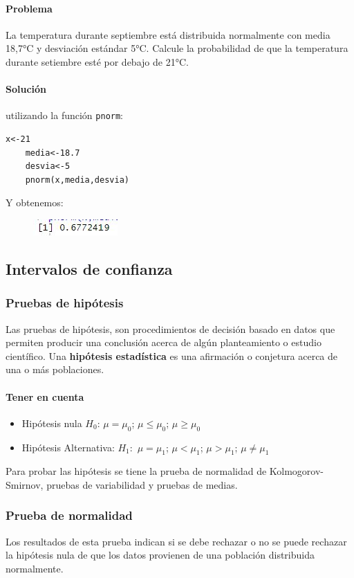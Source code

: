 \documentclass[12pt,hidelinks]{article}
\begin{document}
\paragraph{Problema} La temperatura durante septiembre está distribuida normalmente con media 18,7°C y desviación estándar 5°C. Calcule la probabilidad de que la temperatura durante setiembre esté por debajo de 21°C.
\paragraph{Solución} utilizando la función \texttt{pnorm}:
\begin{lstlisting}[frame=single]
	x<-21
	media<-18.7
	desvia<-5
	pnorm(x,media,desvia)
\end{lstlisting}
Y obtenemos:
\begin{figure}[h!]
	\centering
	\includegraphics[scale=1]{images/3/normal.JPG}
\end{figure}
\subsection{Intervalos de confianza}
\subsubsection{Pruebas de hipótesis}
Las pruebas de hipótesis, son procedimientos de decisión basado en datos que permiten producir una conclusión acerca de algún planteamiento o estudio científico. Una \textbf{hipótesis estadística} es una afirmación o conjetura acerca de una o más poblaciones.
\paragraph{Tener en cuenta}
\begin{itemize}
	\item Hipótesis nula  $H_0$: $\mu=\mu_0$; $\mu\leq\mu_0$; $\mu\geq\mu_0$
	\item Hipótesis Alternativa: $H_1:$ $\mu=\mu_1$; $\mu<\mu_1$; $\mu>\mu_1$; $\mu\neq\mu_1$
\end{itemize}
Para probar las hipótesis se tiene la prueba de normalidad de Kolmogorov-Smirnov, pruebas de variabilidad y pruebas de medias.
\subsubsection{Prueba de normalidad}
Los resultados de esta prueba indican si se debe rechazar o no se puede rechazar la hipótesis nula de que los datos provienen de una población distribuida normalmente.
\end{document}
